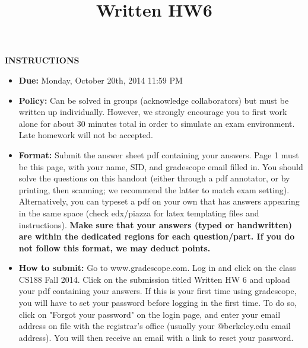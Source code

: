 \documentclass[twoside]{article}
\title{Written HW6}
\begin{document}
\thispagestyle{empty}
\maketitle


\smallskip
\smallskip
\textbf{INSTRUCTIONS}

\begin{itemize}
\item \textbf{Due:} Monday, October 20th, 2014 11:59 PM
\item \textbf{Policy:} Can be solved in groups (acknowledge collaborators) but must
be written up individually. However,
we strongly encourage you to first work alone for about 30 minutes total in order to simulate an exam environment.  Late homework
will not be accepted.
\item \textbf{Format:}  Submit the answer sheet pdf containing your answers. Page 1
must be this page, with your name,
SID, and gradescope email filled in.
You should solve the questions on this handout (either through a pdf annotator, or by printing, then scanning; we recommend the latter to match exam setting). Alternatively, you can typeset a pdf on your own that has answers appearing in the same space (check edx/piazza for latex templating files and instructions).
\textbf{Make sure that your answers (typed or handwritten) are within the
dedicated regions for each question/part.  If you do not follow this format, we may deduct points.}

\item \textbf{How to submit:}  Go to www.gradescope.com. Log in and click on the
class CS188 Fall 2014. Click
on the submission titled Written HW 6 and upload your pdf containing your answers. If this is your first time using
gradescope, you will have to set your password before logging in the
first time.  To do so, click on "Forgot your password" on the login
page, and enter your email address on file with the registrar's office
(usually your @berkeley.edu email address). You will then receive an
email with a link to reset your password.

\end{itemize}
\end{document}
